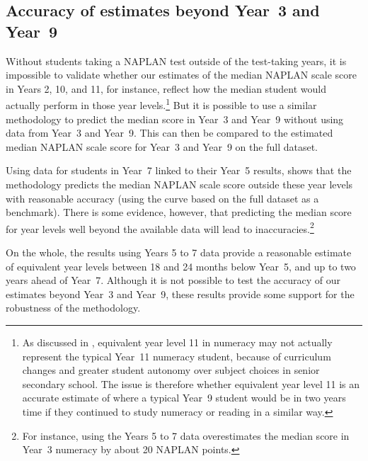 \newpage
\subsection{Accuracy of estimates beyond \mbox{Year 3} and \mbox{Year 9}}

Without students taking a NAPLAN test outside of the test-taking years, it is impossible to validate whether our estimates of the median NAPLAN scale score in Years 2, 10, and 11, for instance, reflect how the median student would actually perform in those year levels.\footnote{As discussed in , equivalent year level 11 in numeracy may not actually represent the typical \mbox{Year 11} numeracy student, because of curriculum changes and greater student autonomy over subject choices in senior secondary school. The issue is therefore whether equivalent year level 11 is an accurate estimate of where a typical \mbox{Year 9} student would be in two years time if they continued to study numeracy or reading in a similar way.} But it is possible to use a similar methodology to predict the median score in \mbox{Year 3} and \mbox{Year 9} without using data from \mbox{Year 3} and \mbox{Year 9}. This can then be compared to the estimated median NAPLAN scale score for \mbox{Year 3} and \mbox{Year 9} on the full dataset. 

Using data for students in \mbox{Year 7} linked to their \mbox{Year 5} results,  shows that the methodology predicts the median NAPLAN scale score outside these year levels with reasonable accuracy (using the curve based on the full dataset as a benchmark). There is some evidence, however, that predicting the median score for year levels well beyond the available data will lead to inaccuracies.\footnote{For instance, using the Years 5 to 7 data overestimates the median score in \mbox{Year 3} numeracy by about 20 NAPLAN points.}

On the whole, the results using Years 5 to 7 data provide a reasonable estimate of equivalent year levels between 18 and 24 months below \mbox{Year 5}, and up to two years ahead of \mbox{Year 7}. Although it is not possible to test the accuracy of our estimates beyond \mbox{Year 3} and \mbox{Year 9}, these results provide some support for the robustness of the methodology.

